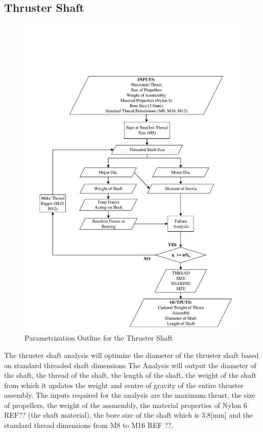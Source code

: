 \documentclass[../main.tex]{subfiles}
\begin{document}
\subsection{Thruster Shaft} \label{thrustShaft}

\begin{figure}[H]
	\centering
	\includegraphics[width=.9\linewidth]{img/paramaterization/thrusterShaft.pdf}
	\caption{Parametrization Outline for the Thruster Shaft}
	\label{fig:ThrusterShaftParametrization}
\end{figure}

The thruster shaft analysis will optimize the diameter of the thruster shaft based on standard threaded shaft dimensions The Analysis will output the diameter of the shaft, the thread of the shaft, the length of the shaft, the weight of the shaft from which it updates the weight and centre of gravity of the entire thruster assembly. The inputs required for the analysis are the maximum thrust, the size of propellers, the weight of the assmembly, the material properties of Nylon 6 REF?? (the shaft material), the bore size of the shaft which is 3.8[mm] and the standard thread dimensions from M8 to M16 REF ??.\\
\end{document}
